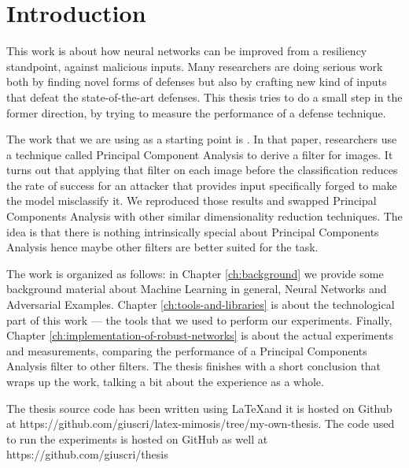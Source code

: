 \chapter*{Introduction}

This work is about how neural networks can be improved from a
resiliency standpoint, against malicious inputs. Many researchers are
doing serious work \cite{papernot2016cleverhans}
\cite{DBLP:journals/corr/KurakinGB16} \cite{carlini2017adversarial}
\cite{meng2017magnet} \cite{yuan2017adversarial} \cite{xu2017feature}
\cite{liao2018defense} both by finding novel forms of defenses but also
by crafting new kind of inputs that defeat the state-of-the-art
defenses. This thesis tries to do a small step in the former direction,
by trying to measure the performance of a defense technique.

The work that we are using as a starting point is
\cite{bhagoji2018enhancing}. In that paper, researchers use a technique
called Principal Component Analysis to derive a filter for images. It
turns out that applying that filter on each image before the
classification reduces the rate of success for an attacker that
provides input specifically forged to make the model misclassify it. We
reproduced those results and swapped Principal Components Analysis with
other similar dimensionality reduction techniques. The idea is that
there is nothing intrinsically special about Principal Components
Analysis hence maybe other filters are better suited for the task.

The work is organized as follows: in Chapter \ref{ch:background} we
provide some background material about Machine Learning in general,
Neural Networks and Adversarial Examples. Chapter
\ref{ch:tools-and-libraries} is about the technological part of this
work --- the tools that we used to perform our experiments. Finally,
Chapter \ref{ch:implementation-of-robust-networks} is about the actual
experiments and measurements, comparing the performance of a Principal
Components Analysis filter to other filters. The thesis finishes
with a short conclusion that wraps up the work, talking a bit about the
experience as a whole.

The thesis source code has been written using \LaTeX and it is hosted
on Github at
https://github.com/giuscri/latex-mimosis/tree/my-own-thesis. The code
used to run the experiments is hosted on GitHub as well at
https://github.com/giuscri/thesis
